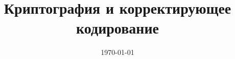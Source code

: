 
\title{Криптография и корректирующее кодирование}
\date{\today}

\maketitle
\tableofcontents
	
	
	
	
	
	

